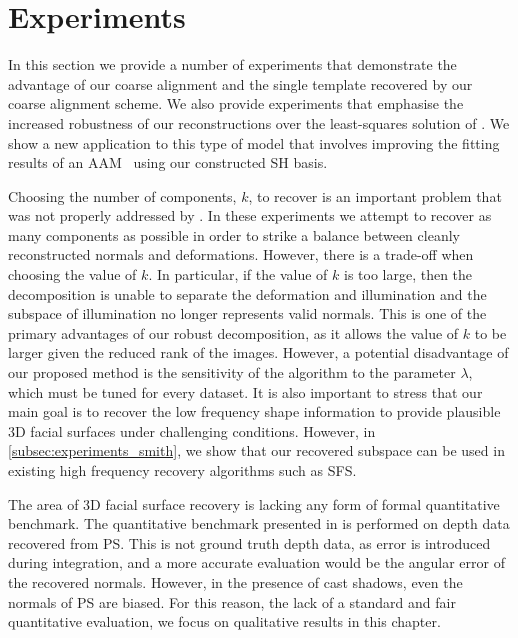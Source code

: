 \section{Experiments}\label{sec:imag_coll_experiments}
In this section we provide a number of experiments that demonstrate the
advantage of our coarse alignment and the single template recovered by our
coarse alignment scheme. We also provide experiments that emphasise the increased
robustness of our reconstructions over the least-squares solution of
\citet{KemelmacherShlizerman:2013iv}. We show a new application to this type
of model that involves improving the fitting results of an 
AAM~\cite{cootes2001active} using our
constructed SH basis. 

Choosing the number of components, $k$, to recover is an
important problem that was not properly addressed by \citet{KemelmacherShlizerman:2013iv}. 
In these experiments we attempt to recover as many
components as possible in order to strike a balance between cleanly
reconstructed normals and deformations. However, there is a trade-off when choosing
the value of $k$. In particular, if the value of $k$ is too large, then the
decomposition is unable to separate the deformation and illumination and the subspace of
illumination no longer represents valid normals. This is one of the primary advantages
of our robust decomposition, as it allows the value of $k$ to be larger given
the reduced rank of the images. However, a potential disadvantage of our
proposed method is the sensitivity of the algorithm to the parameter $\lambda$,
which must be tuned for every dataset. It is also important to stress that our
main goal is to recover the low frequency shape information to provide plausible
3D facial surfaces under challenging conditions. However, in
\cref{subsec:experiments_smith}, we show that our recovered subspace can
be used in existing high frequency recovery algorithms such as SFS.\@

The area of 3D facial surface recovery is lacking any form of formal
quantitative benchmark. The quantitative benchmark presented in
\cite{KemelmacherShlizerman:2013iv} is performed on depth data recovered from PS.\@
This is not ground truth depth data, as error is introduced during
integration, and a more accurate evaluation would be the angular error of the
recovered normals. However, in the presence of cast shadows, even the normals of
PS are biased. For this reason, the lack of a standard and fair
quantitative evaluation, we focus on qualitative results in this chapter.

